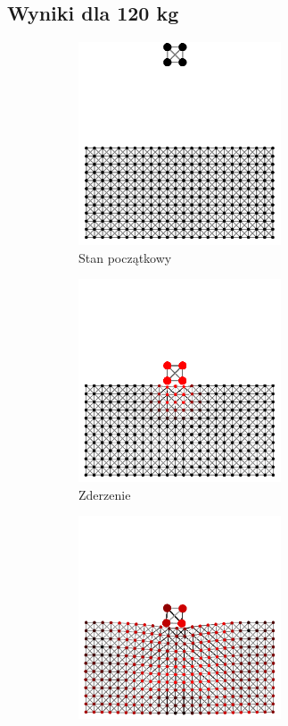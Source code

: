 \documentclass[12pt, letterpaper]{report}
\begin{document}
    \newpage
    \subsection{Wyniki dla 120 kg}
    \begin{figure}[h]

        \begin{subfigure}{0.5\textwidth}
            \centering
            \includegraphics[width=6cm, height=6cm]{collision_2x2_24x12_mass30_1} 
            \caption{Stan początkowy}
        \end{subfigure}
        \begin{subfigure}{0.5\textwidth}
            \centering
            \includegraphics[width=6cm, height=6cm]{collision_2x2_24x12_mass30_2}
            \caption{Zderzenie}
        \end{subfigure}
        \begin{subfigure}{0.5\textwidth}
            \centering
            \includegraphics[width=6cm, height=6cm]{collision_2x2_24x12_mass30_3}

\end{subfigure}
\end{figure}
\end{document}
